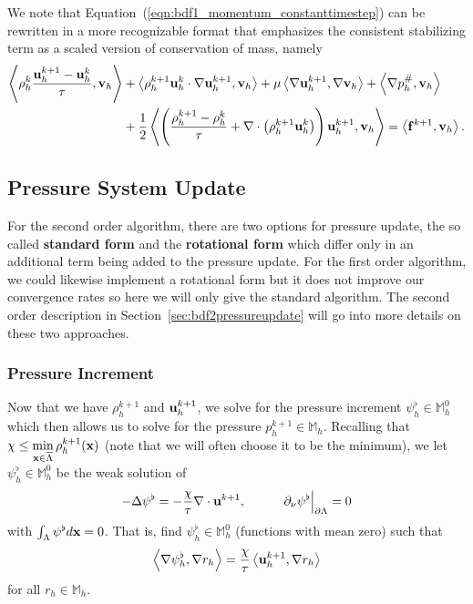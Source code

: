 \documentclass[letterpaper]{erdc}
\begin{document}
We note that Equation~(\ref{eqn:bdf1_momentum_constanttimestep}) can be
rewritten in a more recognizable format that emphasizes the consistent
stabilizing term as a scaled version of conservation of mass, namely
\begin{equation}\label{eqn:bdf1morerecognizableform}
  \begin{split}
\left\langle \rho_h^{k} \frac{\textbf{u}_h^{k+1}-\textbf{u}_h^{k} }{\tau} , \textbf{v}_h \right\rangle &+ \left\langle  \rho_h^{k+1}\textbf{u}_h^{k}\cdot\nabla\textbf{u}_h^{k+1} , \textbf{v}_h \right\rangle + \mu\left\langle  \nabla \textbf{u}_h^{k+1} , \nabla\textbf{v}_h \right\rangle+\left\langle \nabla p_h^{\#}, \textbf{v}_h \right\rangle\\
 &+ \frac{1}{2}\left\langle  \left(\frac{\rho_h^{k+1} - \rho_h^{k}}{\tau} + \nabla\cdot\left(\rho_h^{k+1}\textbf{u}_h^{k}\right)  \right)\textbf{u}_h^{k+1} , \textbf{v}_h \right\rangle = \left\langle \mathbf{f}^{k+1}, \textbf{v}_h \right\rangle.
\end{split}
\end{equation}

%
%
\subsection{Pressure System Update}\label{sec:bdf1pressureupdate}
\begin{remark}For the second order algorithm, there are two options for
  pressure update, the so called \textbf{standard form} and the
  \textbf{rotational form} which differ only in an additional term being added
  to the pressure update.  For the first order algorithm, we could likewise
  implement a rotational form but it does not improve our convergence rates so
  here we will only give the standard algorithm.  The second order description
  in Section~\ref{sec:bdf2pressureupdate} will go into more details on these
  two approaches.\end{remark}

\subsubsection{Pressure Increment}
Now that we have $\rho_h^{k+1}$ and $\textbf{u}_h^{k+1}$, we solve for the pressure
increment $\psi_h^{\flat}\in \mathbb{M}_h^0$ which then allows us to solve for
the pressure $p_h^{k+1}\in \mathbb{M}_h$.  Recalling that
$\chi \leq \displaystyle\min_{\textbf{x}\in\overline{\Lambda}} \rho_h^{k+1}(\textbf{x})$ (note
that we will often choose it to be the minimum), we let
$\psi_h^{\flat}\in \mathbb{M}_h^0$ be the weak solution of
\begin{equation}\label{eqn:pressureincrementLaplacian}
  -\Delta \psi^{\flat} = -\frac{\chi}{\tau}\nabla\cdot \textbf{u}^{k+1}, \hspace{1cm} \left.\partial_\nu\psi^{\flat}\right|_{\partial\Lambda} = 0
\end{equation}
with $\int_{\Lambda} \psi^{\flat} d\textbf{x} = 0$.  That is, find $\psi_h^{\flat}\in \mathbb{M}_h^0$ (functions with mean zero) such that
\begin{equation}
  \left\langle \nabla\psi_h^{\flat}, \nabla r_h \right\rangle = \frac{\chi}{\tau}\left\langle \textbf{u}_h^{k+1}, \nabla r_h \right\rangle
\end{equation}
for all $r_h \in \mathbb{M}_h$.  
\end{document}
